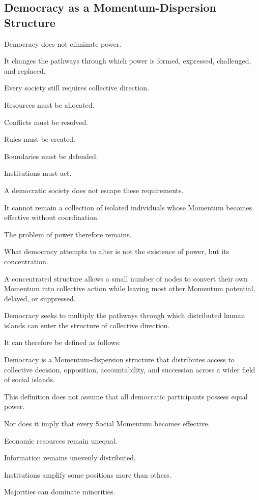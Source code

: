 \subsection*{\textbf{Democracy as a Momentum-Dispersion Structure}}

Democracy does not eliminate power.

It changes the pathways through which power is formed, expressed, challenged, and replaced.

Every society still requires collective direction.

Resources must be allocated.

Conflicts must be resolved.

Rules must be created.

Boundaries must be defended.

Institutions must act.

A democratic society does not escape these requirements.

It cannot remain a collection of isolated individuals whose Momentum becomes effective without coordination.

The problem of power therefore remains.

What democracy attempts to alter is not the existence of power, but its concentration.

A concentrated structure allows a small number of nodes to convert their own Momentum into collective action while leaving most other Momentum potential, delayed, or suppressed.

Democracy seeks to multiply the pathways through which distributed human islands can enter the structure of collective direction.

It can therefore be defined as follows:

Democracy is a Momentum-dispersion structure that distributes access to collective decision, opposition, accountability, and succession across a wider field of social islands.

This definition does not assume that all democratic participants possess equal power.

Nor does it imply that every Social Momentum becomes effective.

Economic resources remain unequal.

Information remains unevenly distributed.

Institutions amplify some positions more than others.

Majorities can dominate minorities.

